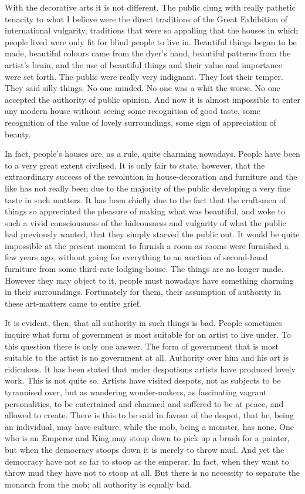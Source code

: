 With the decorative arts it is not different. The public clung with really pathetic tenacity to what I believe were the direct traditions of the Great Exhibition of international vulgarity, traditions that were so appalling that the houses in which people lived were only fit for blind people to live in. Beautiful things began to be made, beautiful colours came from the dyer’s hand, beautiful patterns from the artist’s brain, and the use of beautiful things and their value and importance were set forth. The public were really very indignant. They lost their temper. They said silly things. No one minded. No one was a whit the worse. No one accepted the authority of public opinion. And now it is almost impossible to enter any modern house without seeing some recognition of good taste, some recognition of the value of lovely surroundings, some sign of appreciation of beauty.\par

In fact, people’s houses are, as a rule, quite charming nowadays. People have been to a very great extent civilised. It is only fair to state, however, that the extraordinary success of the revolution in house-decoration and furniture and the like has not really been due to the majority of the public developing a very fine taste in such matters. It has been chiefly due to the fact that the craftsmen of things so appreciated the pleasure of making what was beautiful, and woke to such a vivid consciousness of the hideousness and vulgarity of what the public had previously wanted, that they simply starved the public out. It would be quite impossible at the present moment to furnish a room as rooms were furnished a few years ago, without going for everything to an auction of second-hand furniture from some third-rate lodging-house. The things are no longer made. However they may object to it, people must nowadays have something charming in their surroundings. Fortunately for them, their assumption of authority in these art-matters came to entire grief.\par

It is evident, then, that all authority in such things is bad. People sometimes inquire what form of government is most suitable for an artist to live under. To this question there is only one answer. The form of government that is most suitable to the artist is no government at all. Authority over him and his art is ridiculous. It has been stated that under despotisms artists have produced lovely work. This is not quite so. Artists have visited despots, not as subjects to be tyrannised over, but as wandering wonder-makers, as fascinating vagrant personalities, to be entertained and charmed and suffered to be at peace, and allowed to create. There is this to be said in favour of the despot, that he, being an individual, may have culture, while the mob, being a monster, has none. One who is an Emperor and King may stoop down to pick up a brush for a painter, but when the democracy stoops down it is merely to throw mud. And yet the democracy have not so far to stoop as the emperor. In fact, when they want to throw mud they have not to stoop at all. But there is no necessity to separate the monarch from the mob; all authority is equally bad.\par

